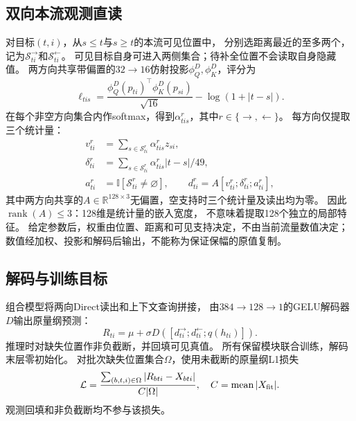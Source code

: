 \subsection{双向本流观测直读}
对目标$(t,i)$，从$s\leq t$与$s\geq t$的本流可见位置中，
分别选距离最近的至多两个，记为$\mathcal S^{\rightarrow}_{ti}$和$\mathcal S^{\leftarrow}_{ti}$。
可见目标自身可进入两侧集合；待补全位置不会读取自身隐藏值。
两方向共享带偏置的$32\to16$仿射投影$\phi_Q^D,\phi_K^D$，评分为
\begin{equation}
 \ell_{tis}=\frac{\phi_Q^D(p_{ti})^\top\phi_K^D(p_{si})}{\sqrt{16}}
             -\log(1+|t-s|).
 \label{eq:direct-score}
\end{equation}
在每个非空方向集合内作softmax，得到$\alpha^{r}_{tis}$，其中$r\in\{\rightarrow,\leftarrow\}$。
每方向仅提取三个统计量：
\begin{equation}
 \begin{aligned}
 v^r_{ti}&=\sum_{s\in\mathcal S^r_{ti}}\alpha^r_{tis}z_{si},\\
 \delta^r_{ti}&=\sum_{s\in\mathcal S^r_{ti}}\alpha^r_{tis}|t-s|/49,\\
 a^r_{ti}&=\mathbb I[\mathcal S^r_{ti}\ne\varnothing],\qquad
 d^r_{ti}=A[v^r_{ti};\delta^r_{ti};a^r_{ti}],
 \end{aligned}
 \label{eq:direct-statistics}
\end{equation}
其中两方向共享的$A\in\mathbb R^{128\times3}$无偏置，空支持时三个统计量及读出均为零。
因此$\operatorname{rank}(A)\leq3$：128维是统计量的嵌入宽度，
不意味着提取128个独立的局部特征。
给定参数后，权重由位置、距离和可见支持决定，不由当前流量数值决定；
数值经加权、投影和解码后输出，不能称为保证保幅的原值复制。

\subsection{解码与训练目标}
组合模型将两向Direct读出和上下文查询拼接，
由$384\to128\to1$的GELU解码器$D$输出原量纲预测：
\begin{equation}
 R_{ti}=\mu+\sigma D([d^{\rightarrow}_{ti};d^{\leftarrow}_{ti};q(h_{ti})]).
 \label{eq:decoder}
\end{equation}
推理时对缺失位置作非负截断，并回填可见真值。
所有保留模块联合训练，解码末层零初始化。
对批次缺失位置集合$\Omega$，使用未截断的原量纲L1损失
\begin{equation}
 \mathcal L=\frac{\sum_{(b,t,i)\in\Omega}|R_{bti}-X_{bti}|}{C|\Omega|},
 \quad C=\operatorname{mean}|X_{\rm fit}|.
 \label{eq:missing-loss}
\end{equation}
观测回填和非负截断均不参与该损失。

